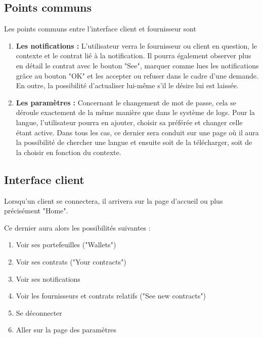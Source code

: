 \subsection{Points communs}
Les points communs entre l'interface client et fournisseur sont
\begin{enumerate}
\item \textbf{Les notifications :}\newline
L'utilisateur verra le fournisseur ou client en question, le contexte et le contrat lié à la notification.\newline
Il pourra également observer plus en détail le contrat avec le bouton "See", marquer comme lues les notifications grâce au bouton "OK" et les accepter ou refuser dans le cadre d'une demande.\newline
En outre, la possibilité d'actualiser lui-même s'il le désire lui est laissée.
\item \textbf{Les paramètres :}\newline
Concernant le changement de mot de passe, cela se déroule exactement de la même manière que dans le système de logs.
Pour la langue, l'utilisateur pourra en ajouter, choisir sa préférée et changer celle étant active.\newline
Dans tous les cas, ce dernier sera conduit sur une page où il aura la possibilité de chercher une langue et ensuite soit de la télécharger, soit de la choisir en fonction du contexte.
\end{enumerate}



\newpage
\subsection{Interface client}

Lorsqu'un client se connectera, il arrivera sur la page d'accueil ou plus précisément "Home".
\begin{flushleft}
Ce dernier aura alors les possibilités suivantes :
\end{flushleft}
\begin{enumerate}
\item Voir ses portefeuilles ("Wallets")
\item Voir ses contrats ("Your contracts")
\item Voir ses notifications
\item Voir les fournisseurs et contrats relatifs ("See new contracts")
\item Se déconnecter
\item Aller sur la page des paramètres
\end{enumerate}

